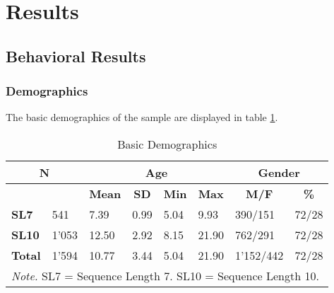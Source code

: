 \section{Results}\label{Results}
\subsection{Behavioral Results}
\subsubsection{Demographics}
The basic demographics of the sample are displayed in table \ref{tab:demo}.
\begin{table}[H]
\centering
    \begin{tabular}{llllllll}
    \hline

    \multicolumn{2}{c}{\textbf{N}} & \multicolumn{4}{c}{\textbf{Age}}                                                                                                        & \multicolumn{2}{c}{\textbf{Gender}}                                \\ \hline
                    &          & \multicolumn{1}{c}{\textbf{Mean}} & \multicolumn{1}{c}{\textbf{SD}} & \multicolumn{1}{c}{\textbf{Min}} & \multicolumn{1}{c}{\textbf{Max}} & \multicolumn{1}{c}{\textbf{M/F}} & \multicolumn{1}{c}{\textbf{\%}} \\ \cline{3-8}
\textbf{SL7}         & 541      & 7.39                              & 0.99                            & 5.04                             & 9.93                             & 390/151                          & 72/28                           \\
\textbf{SL10}        & 1'053     & 12.50                             & 2.92                            & 8.15                             & 21.90                            & 762/291                          & 72/28                           \\
\textbf{Total}      & 1'594     & 10.77                             & 3.44                            & 5.04                             & 21.90                            & 1'152/442                         & 72/28    \\ \hline     
 \multicolumn{8}{l}{\small \textit{Note.} SL7 = Sequence Length 7. SL10 = Sequence Length 10.}
\end{tabular}
\caption{Basic Demographics}
    \label{tab:demo}
\end{table}

